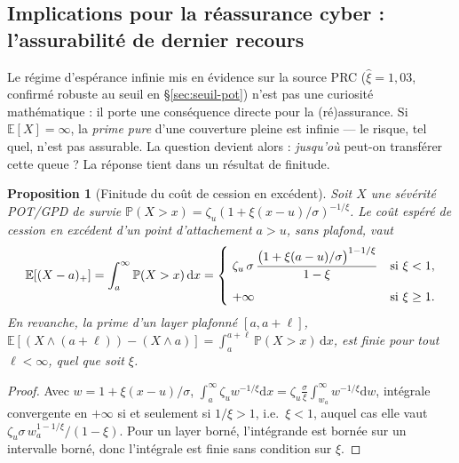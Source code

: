 \documentclass[11pt,a4paper]{article}
\theoremstyle{navystyle}
\newtheorem{proposition}[theorem]{Proposition}
\theoremstyle{navydef}
\newcommand{\E}{\mathbb{E}}
\newcommand{\Prob}{\mathbb{P}}
\newcommand{\dd}{\mathrm{d}}
\begin{document}
\subsection{Implications pour la réassurance cyber : l'assurabilité de dernier recours}
\label{sec:reassurance}

Le régime d'espérance infinie mis en évidence sur la source PRC ($\hat\xi=1{,}03$, confirmé robuste au seuil en §\ref{sec:seuil-pot}) n'est pas une curiosité mathématique : il porte une conséquence directe pour la (ré)assurance. Si $\E[X]=\infty$, la \emph{prime pure} d'une couverture pleine est infinie --- le risque, tel quel, n'est pas assurable. La question devient alors : \emph{jusqu'où} peut-on transférer cette queue ? La réponse tient dans un résultat de finitude.

\begin{proposition}[Finitude du coût de cession en excédent]\label{prop:reass}
Soit $X$ une sévérité POT/GPD de survie $\Prob(X>x)=\zeta_u(1+\xi(x-u)/\sigma)^{-1/\xi}$. Le coût espéré de cession en excédent d'un point d'attachement $a>u$, \emph{sans plafond}, vaut
\begin{equation}
\E[(X-a)_+]=\int_a^\infty \Prob(X>x)\,\dd x
=\begin{dcases}
\ \zeta_u\,\sigma\,\frac{\bigl(1+\xi(a-u)/\sigma\bigr)^{1-1/\xi}}{1-\xi} & \text{si } \xi<1,\\[4pt]
\ +\infty & \text{si } \xi\ge1.
\end{dcases}
\end{equation}
En revanche, la prime d'un \emph{layer plafonné} $[a,a+\ell]$, $\E[(X\wedge(a+\ell))-(X\wedge a)]=\int_a^{a+\ell}\Prob(X>x)\,\dd x$, est finie pour tout $\ell<\infty$, quel que soit $\xi$.
\end{proposition}

\begin{proof}
Avec $w=1+\xi(x-u)/\sigma$, $\int_a^\infty \zeta_u w^{-1/\xi}\dd x=\zeta_u\frac\sigma\xi\int_{w_a}^\infty w^{-1/\xi}\dd w$, intégrale convergente en $+\infty$ si et seulement si $1/\xi>1$, i.e.\ $\xi<1$, auquel cas elle vaut $\zeta_u\sigma\,w_a^{1-1/\xi}/(1-\xi)$. Pour un layer borné, l'intégrande est bornée sur un intervalle borné, donc l'intégrale est finie sans condition sur $\xi$. \end{proof}
\end{document}
